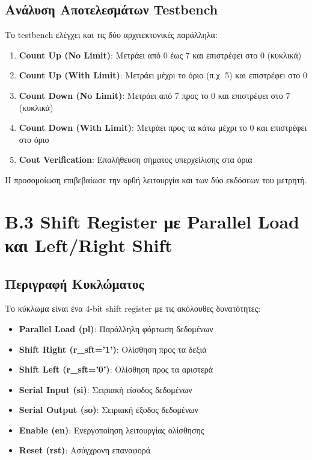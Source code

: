 \documentclass[12pt]{article}
\begin{document}
\subsection*{Ανάλυση Αποτελεσμάτων Testbench}

Το testbench ελέγχει και τις δύο αρχιτεκτονικές παράλληλα:

\begin{enumerate}
    \item \textbf{Count Up (No Limit)}: Μετράει από 0 έως 7 και επιστρέφει στο 0 (κυκλικά)
    \item \textbf{Count Up (With Limit)}: Μετράει μέχρι το όριο (π.χ. 5) και επιστρέφει στο 0
    \item \textbf{Count Down (No Limit)}: Μετράει από 7 προς το 0 και επιστρέφει στο 7 (κυκλικά)
    \item \textbf{Count Down (With Limit)}: Μετράει προς τα κάτω μέχρι το 0 και επιστρέφει στο όριο
    \item \textbf{Cout Verification}: Επαλήθευση σήματος υπερχείλισης στα όρια
\end{enumerate}

Η προσομοίωση επιβεβαίωσε την ορθή λειτουργία και των δύο εκδόσεων του μετρητή.

\newpage
\section*{Β.3 Shift Register με Parallel Load και Left/Right Shift}

\subsection*{Περιγραφή Κυκλώματος}

Το κύκλωμα είναι ένα 4-bit shift register με τις ακόλουθες δυνατότητες:
\begin{itemize}
    \item \textbf{Parallel Load (pl)}: Παράλληλη φόρτωση δεδομένων
    \item \textbf{Shift Right (r\_sft='1')}: Ολίσθηση προς τα δεξιά
    \item \textbf{Shift Left (r\_sft='0')}: Ολίσθηση προς τα αριστερά
    \item \textbf{Serial Input (si)}: Σειριακή είσοδος δεδομένων
    \item \textbf{Serial Output (so)}: Σειριακή έξοδος δεδομένων
    \item \textbf{Enable (en)}: Ενεργοποίηση λειτουργίας ολίσθησης
    \item \textbf{Reset (rst)}: Ασύγχρονη επαναφορά
\end{itemize}
\end{document}
